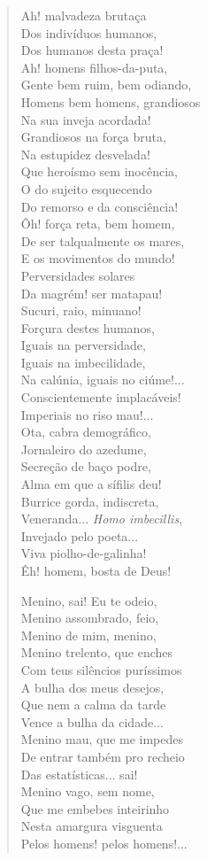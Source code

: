 \begin{verse}
Ah! malvadeza brutaça\\
Dos indivíduos humanos,\\
Dos humanos desta praça!\\
Ah! homens filhos-da-puta,\\
Gente bem ruim, bem odiando,\\
Homens bem homens, grandiosos\\
Na sua inveja acordada!\\
Grandiosos na força bruta,\\
Na estupidez desvelada!\\
Que heroísmo sem inocência,\\
O do sujeito esquecendo\\
Do remorso e da consciência!\\
Ôh! força reta, bem homem,\\
De ser talqualmente os mares,\\
E os movimentos do mundo!\\
Perversidades solares\\
Da magrém! ser matapau!\\
Sucuri, raio, minuano!\\
Forçura destes humanos,\\
Iguais na perversidade,\\
Iguais na imbecilidade,\\
Na calúnia, iguais no ciúme!...\\
Conscientemente implacáveis!\\
Imperiais no riso mau!...\\
Ota, cabra demográfico,\\
Jornaleiro do azedume,\\
Secreção de baço podre,\\
Alma em que a sífilis deu!\\
Burrice gorda, indiscreta,\\
Veneranda... \emph{Homo imbecillis},\\
Invejado pelo poeta...\\
Viva piolho-de-galinha!\\
Êh! homem, bosta de Deus!

Menino, sai! Eu te odeio,\\
Menino assombrado, feio,\\
Menino de mim, menino,\\
Menino trelento, que enches\\
Com teus silêncios puríssimos\\
A bulha dos meus desejos,\\
Que nem a calma da tarde\\
Vence a bulha da cidade...\\
Menino mau, que me impedes\\
De entrar também pro recheio\\
Das estatísticas... sai!\\
Menino vago, sem nome,\\
Que me embebes inteirinho\\
Nesta amargura visguenta\\
Pelos homens! pelos homens!...


\end{verse}
